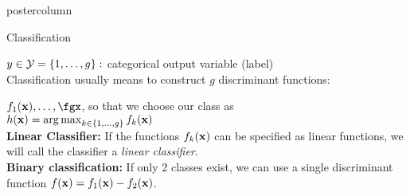 \documentclass{beamer}
\begin{document}
\begin{frame}[fragile]{}
\begin{columns}
\begin{column}{.31\textwidth}
\begin{beamercolorbox}[center]{postercolumn}
\begin{minipage}{.98\textwidth}
{\begin{myblock}{Classification}
%             

 $y \in \mathcal{Y} = \{1, \ldots, g\} : $ categorical output variable (label)\\ 

Classification usually means to construct $g$ discriminant functions:
  
$f_1(\xv), \ldots, \fgx$, so that we choose our class as \\ 
 $h(\mathbf{x}) = \operatorname{arg\,max}_{k \in \{1, \ldots, g\}} f_{k}(\mathbf{x})$ \\

\textbf{Linear Classifier:} If the functions $f_{k}(\mathbf{x})$ can be specified as linear functions, we will call 
the classifier a \emph{linear classifier}.\\


\textbf{Binary classification: }If only 2 classes exist, we can use a single discriminant function $f(\mathbf{x}) = f_{1}(\mathbf{x}) - f_{2}(\mathbf{x})$.  

\end{myblock}
			  }
			\end{minipage}
		\end{beamercolorbox}
	\end{column}
\end{columns}

\end{frame}
\end{document}
